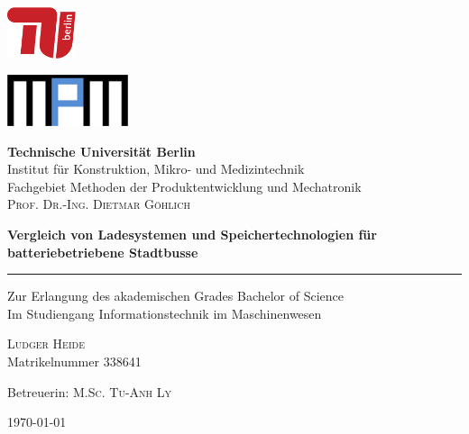 \documentclass[twoside]{scrreprt}
\begin{document}
\begin{titlepage}

\begin{minipage}{0.4\textwidth}
	\begin{flushleft}
		\includegraphics[height=1.5cm]{TU_Logo}
	\end{flushleft}
\end{minipage}
\hfill
\begin{minipage}{0.4\textwidth}
	\begin{flushright}
		\includegraphics[height=1.5cm]{MPM_Logo}%
	\end{flushright}
\end{minipage}

\begin{center}    
\textbf{\LARGE Technische Universität Berlin}\\
\large{Institut für Konstruktion, Mikro- und Medizintechnik}\\
\large{Fachgebiet Methoden der Produktentwicklung und Mechatronik}\\
\large{\textsc{Prof. Dr.-Ing. Dietmar Göhlich}}\\
\vfill

\huge{\textbf{Vergleich von Ladesystemen und Speichertechnologien für batteriebetriebene Stadtbusse}}\\
\rule{\linewidth}{1pt}
\large{Zur Erlangung des akademischen Grades Bachelor of Science}\\
\large{Im Studiengang Informationstechnik im Maschinenwesen}\\
\vfill

\large{\textsc{Ludger Heide}}\\
\large{Matrikelnummer 338641}\\
\vfill

\large{Betreuerin: \textsc{M.Sc. Tu-Anh Ly}}\\
\vfill

\large{\today}
\end{center}
\end{titlepage}
\end{document}
